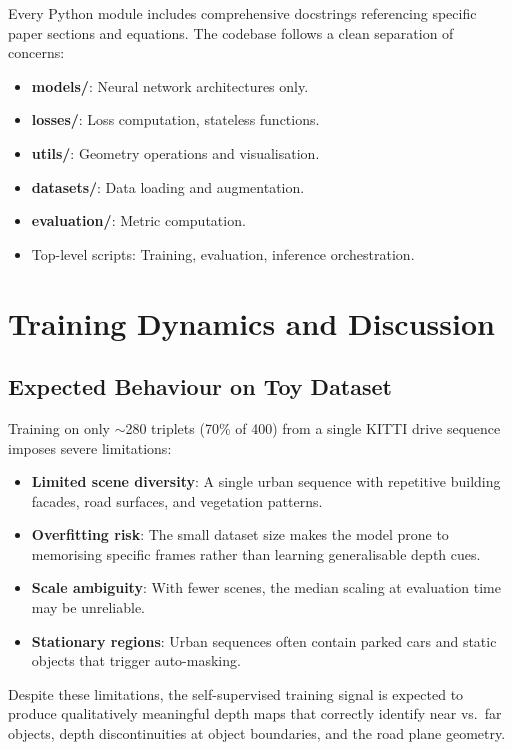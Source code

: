\documentclass[10pt, a4paper, twocolumn]{article}
\begin{document}
Every Python module includes comprehensive docstrings referencing specific paper sections and equations. The codebase follows a clean separation of concerns:
\begin{itemize}[noitemsep]
    \item \textbf{models/}: Neural network architectures only.
    \item \textbf{losses/}: Loss computation, stateless functions.
    \item \textbf{utils/}: Geometry operations and visualisation.
    \item \textbf{datasets/}: Data loading and augmentation.
    \item \textbf{evaluation/}: Metric computation.
    \item Top-level scripts: Training, evaluation, inference orchestration.
\end{itemize}

\section{Training Dynamics and Discussion}
\label{sec:discussion}

\subsection{Expected Behaviour on Toy Dataset}

Training on only $\sim$280 triplets (70\% of 400) from a single KITTI drive sequence imposes severe limitations:

\begin{itemize}[noitemsep]
    \item \textbf{Limited scene diversity}: A single urban sequence with repetitive building facades, road surfaces, and vegetation patterns.
    \item \textbf{Overfitting risk}: The small dataset size makes the model prone to memorising specific frames rather than learning generalisable depth cues.
    \item \textbf{Scale ambiguity}: With fewer scenes, the median scaling at evaluation time may be unreliable.
    \item \textbf{Stationary regions}: Urban sequences often contain parked cars and static objects that trigger auto-masking.
\end{itemize}

Despite these limitations, the self-supervised training signal is expected to produce qualitatively meaningful depth maps that correctly identify near vs.\ far objects, depth discontinuities at object boundaries, and the road plane geometry.
\end{document}
